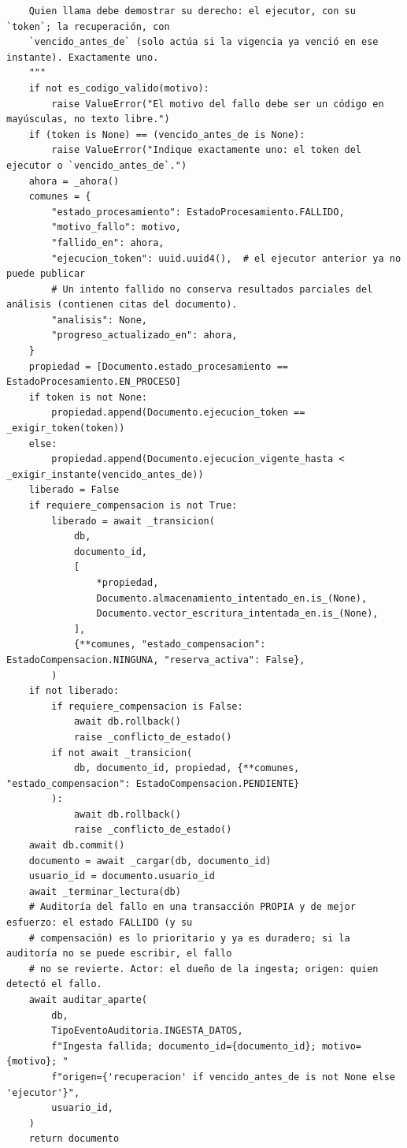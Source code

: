 \documentclass[11pt,a4paper]{article}
\begin{document}
\begin{lstlisting}
    Quien llama debe demostrar su derecho: el ejecutor, con su `token`; la recuperación, con
    `vencido_antes_de` (solo actúa si la vigencia ya venció en ese instante). Exactamente uno.
    """
    if not es_codigo_valido(motivo):
        raise ValueError("El motivo del fallo debe ser un código en mayúsculas, no texto libre.")
    if (token is None) == (vencido_antes_de is None):
        raise ValueError("Indique exactamente uno: el token del ejecutor o `vencido_antes_de`.")
    ahora = _ahora()
    comunes = {
        "estado_procesamiento": EstadoProcesamiento.FALLIDO,
        "motivo_fallo": motivo,
        "fallido_en": ahora,
        "ejecucion_token": uuid.uuid4(),  # el ejecutor anterior ya no puede publicar
        # Un intento fallido no conserva resultados parciales del análisis (contienen citas del documento).
        "analisis": None,
        "progreso_actualizado_en": ahora,
    }
    propiedad = [Documento.estado_procesamiento == EstadoProcesamiento.EN_PROCESO]
    if token is not None:
        propiedad.append(Documento.ejecucion_token == _exigir_token(token))
    else:
        propiedad.append(Documento.ejecucion_vigente_hasta < _exigir_instante(vencido_antes_de))
    liberado = False
    if requiere_compensacion is not True:
        liberado = await _transicion(
            db,
            documento_id,
            [
                *propiedad,
                Documento.almacenamiento_intentado_en.is_(None),
                Documento.vector_escritura_intentada_en.is_(None),
            ],
            {**comunes, "estado_compensacion": EstadoCompensacion.NINGUNA, "reserva_activa": False},
        )
    if not liberado:
        if requiere_compensacion is False:
            await db.rollback()
            raise _conflicto_de_estado()
        if not await _transicion(
            db, documento_id, propiedad, {**comunes, "estado_compensacion": EstadoCompensacion.PENDIENTE}
        ):
            await db.rollback()
            raise _conflicto_de_estado()
    await db.commit()
    documento = await _cargar(db, documento_id)
    usuario_id = documento.usuario_id
    await _terminar_lectura(db)
    # Auditoría del fallo en una transacción PROPIA y de mejor esfuerzo: el estado FALLIDO (y su
    # compensación) es lo prioritario y ya es duradero; si la auditoría no se puede escribir, el fallo
    # no se revierte. Actor: el dueño de la ingesta; origen: quien detectó el fallo.
    await auditar_aparte(
        db,
        TipoEventoAuditoria.INGESTA_DATOS,
        f"Ingesta fallida; documento_id={documento_id}; motivo={motivo}; "
        f"origen={'recuperacion' if vencido_antes_de is not None else 'ejecutor'}",
        usuario_id,
    )
    return documento
\end{lstlisting}
\end{document}
